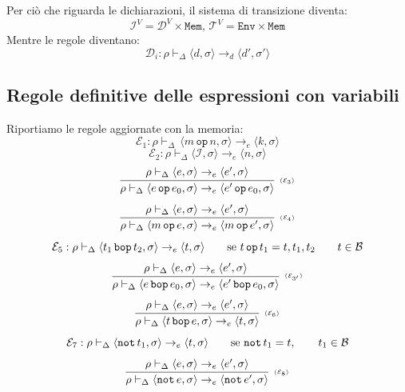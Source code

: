 \documentclass[oneside,a4paper,11pt]{book}
\theoremstyle{italicstyle}
\theoremstyle{normStyle}
\begin{document}
Per ciò che riguarda le dichiarazioni, il sistema di transizione diventa:
\[
  \mathcal{I}^V=\mathcal{D}^V \times \texttt{Mem},\,\mathcal{T}^V = \texttt{Env}\times\texttt{Mem}
\]
Mentre le regole diventano:
\[
  \mathcal{D}_i : \rho \vdash_\Delta \langle d,\sigma \rangle \rightarrow_d \langle d',\sigma' \rangle
\]
\subsection{Regole definitive delle espressioni con variabili}
Riportiamo le regole aggiornate con la memoria:
\[
  \mathcal{E}_1: \rho \vdash_\Delta\, \langle m \,\texttt{op} \,n, \sigma \rangle \rightarrow_e \langle k, \sigma \rangle
\]
\[
  \mathcal{E}_2: \rho \vdash_\Delta \langle \mathcal{I}, \sigma \rangle \rightarrow_e  \langle n, \sigma \rangle
\]
\[
    \infer[\scriptscriptstyle (\mathcal{E}_3)]
    {
      \rho \vdash_\Delta \langle e \,\texttt{op} \,e_0, \sigma \rangle \rightarrow_e \langle e' \,\texttt{op} \,e_0, \sigma \rangle
    }
    {
      \rho \vdash_\Delta \langle e , \sigma \rangle \rightarrow_e \langle e', \sigma \rangle
    }
\]
\[
    \infer[\scriptscriptstyle (\mathcal{E}_4)]
    {
      \rho \vdash_\Delta  \langle m \,\texttt{op} \,e, \sigma \rangle \rightarrow_e \langle m \,\texttt{op} \,e', \sigma \rangle
    }
    {
      \rho \vdash_\Delta \langle e , \sigma \rangle \rightarrow_e \langle e', \sigma \rangle
    }
\]
\[
  \mathcal{E}_5: \rho \vdash_\Delta \langle t_1 \,\texttt{bop} \,t_2, \sigma \rangle \rightarrow_e \langle t, \sigma \rangle \qquad \text{se }t\,\verb|op|\,t_1 = t,t_1,t_2 \qquad t \in \mathcal{B}
\]
\[
    \infer[\scriptscriptstyle (\mathcal{E}_{3'})]
    {
      \rho \vdash_\Delta \langle e \,\texttt{bop} \,e_0, \sigma \rangle \rightarrow_e \langle e' \,\texttt{bop} \,e_0, \sigma \rangle
    }
    {
      \rho \vdash_\Delta \langle e , \sigma \rangle \rightarrow_e \langle e', \sigma \rangle
    }
\]
\[
    \infer[\scriptscriptstyle (\mathcal{E}_{6})]
    {
      \rho \vdash_\Delta  \langle t \,\texttt{bop} \,e, \sigma \rangle \rightarrow_e \langle t , \sigma \rangle
    }
    {
      \rho \vdash_\Delta \langle e , \sigma \rangle \rightarrow_e \langle e', \sigma \rangle
    }
\]
\[
  \mathcal{E}_7: \rho \vdash_\Delta \langle \texttt{not} \,t_1, \sigma \rangle\rightarrow_e \langle t, \sigma \rangle \qquad \text{se }\verb|not|\,t_1 = t, \qquad t_1\in \mathcal{B}
\]
\[
    \infer[\scriptscriptstyle (\mathcal{E}_{8})]
    {
      \rho \vdash_\Delta \langle \texttt{not} \,e, \sigma \rangle \rightarrow_e \langle \texttt{not} \,e', \sigma \rangle
    }
    {
      \rho \vdash_\Delta \langle e , \sigma \rangle \rightarrow_e \langle e', \sigma \rangle
    }
\]
\end{document}
